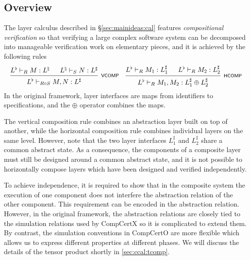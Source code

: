 \documentclass[acmsmall,review,anonymous]{acmart}\settopmatter{printfolios=true,printccs=false,printacmref=false}
\begin{document}


\subsection{Overview} %


The layer calculus
described in \S\ref{sec:mainideas:cal}
features \emph{compositional verification}
so that verifying a large complex software system
can be decomposed into
manageable verification work
on elementary pieces,
and it is achieved by the following rules
\[
  \begin{prooftree}
    \hypo{L^\flat \vdash_R M : L^\natural}
    \hypo{L^\natural \vdash_S N : L^\sharp}
    \infer2[\scriptsize\kw{VCOMP}]{L^\flat \vdash_{R \circ S} M, N : L^\sharp}
  \end{prooftree}
  \quad
  \begin{prooftree}
    \hypo{L^\flat \vdash_R M_1 : L_1^\sharp}
    \hypo{L^\flat \vdash_R M_2 : L_2^\sharp}
    \infer2[\scriptsize\kw{HCOMP}]{L^\flat \vdash_R M_1, M_2 :
      L_1^\sharp \oplus L_2^\sharp}
  \end{prooftree}
\]
In the original framework,
layer interfaces are maps from identifiers to
specifications,
and the $\oplus$ operator combines the maps.

The vertical composition rule
combines an abstraction layer built on top of another,
while the horizontal composition rule combines
individual layers on the same level.
However, note that the two layer interfaces
$L_1^\sharp$ and $L_2^\sharp$
share a common abstract state.
As a consequence, 
the components of a composite layer
must still be designed around a common abstract state,
and it is not possible to horizontally compose layers
which have been designed and verified independently.

To achieve independence,
it is required to show that
in the composite system
the execution of one component
does not interfere the abstraction relation
of the other component.
This requirement can be encoded
in the abstraction relation.
However,
in the original framework,
the abstraction relations
are closely tied to
the simulation relations used by CompCertX
so it is complicated to extend them.
By contrast,
the simulation conventions in CompCertO
are more flexible
which allows us to express
different properties at different phases.
We will discuss the details of the tensor product
shortly in \ref{sec:ccal:tcomp}.
\end{document}
